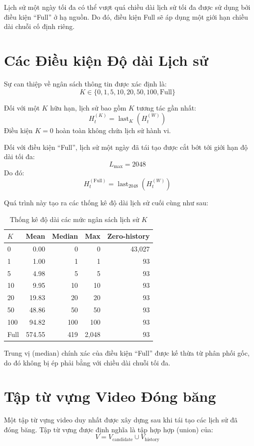 \documentclass[12pt,a4paper]{article}
\begin{document}
Lịch sử một ngày tối đa có thể vượt quá chiều dài lịch sử tối đa được sử dụng bởi điều kiện ``Full'' ở hạ nguồn. Do đó, điều kiện Full sẽ áp dụng một giới hạn chiều dài chuỗi cố định riêng.

\section{Các Điều kiện Độ dài Lịch sử}
Sự can thiệp về ngân sách thông tin được xác định là:
\[
K \in \{0, 1, 5, 10, 20, 50, 100, \mathrm{Full}\}
\]

Đối với một $K$ hữu hạn, lịch sử bao gồm $K$ tương tác gần nhất:
\[
H_t^{(K)} = \operatorname{last}_K \left( H_t^{(W)} \right)
\]
Điều kiện $K=0$ hoàn toàn không chứa lịch sử hành vi.

Đối với điều kiện ``Full'', lịch sử một ngày đã tái tạo được cắt bớt tới giới hạn độ dài tối đa:
\[
L_{\max} = 2048
\]
Do đó:
\[
H_t^{(\mathrm{Full})} = \operatorname{last}_{2048} \left( H_t^{(W)} \right)
\]

Quá trình này tạo ra các thống kê độ dài lịch sử cuối cùng như sau:

\begin{table}[h]
\centering
\caption{Thống kê độ dài các mức ngân sách lịch sử $K$}
\label{tab:history-length-conditions}
\begin{tabular}{lrrrr}
\toprule
\textbf{$K$} & \textbf{Mean} & \textbf{Median} & \textbf{Max} & \textbf{Zero-history} \\
\midrule
0 & 0.00 & 0 & 0 & 43,027 \\
1 & 1.00 & 1 & 1 & 93 \\
5 & 4.98 & 5 & 5 & 93 \\
10 & 9.95 & 10 & 10 & 93 \\
20 & 19.83 & 20 & 20 & 93 \\
50 & 48.86 & 50 & 50 & 93 \\
100 & 94.82 & 100 & 100 & 93 \\
Full & 574.55 & 419 & 2,048 & 93 \\
\bottomrule
\end{tabular}
\end{table}

Trung vị (median) chính xác của điều kiện ``Full'' được kế thừa từ phân phối gốc, do đó không bị ép phải bằng với chiều dài chuỗi tối đa.

\section{Tập từ vựng Video Đóng băng}
Một tập từ vựng video duy nhất được xây dựng sau khi tái tạo các lịch sử đã đóng băng. Tập từ vựng được định nghĩa là tập hợp hợp (union) của:
\[
V = V_{\mathrm{candidate}} \cup V_{\mathrm{history}}
\]
\end{document}
